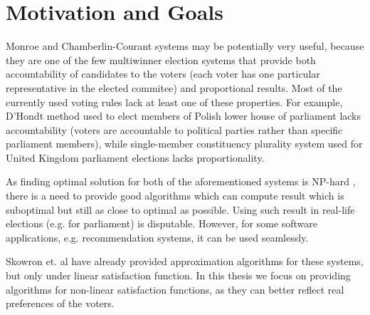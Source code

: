 \chapter{Motivation and Goals}
\label{cha:motivation}

Monroe and Chamberlin-Courant systems may be potentially very useful, because they are one of the few multiwinner election systems that provide both accountability of candidates to the voters (each voter has one particular representative in the elected commitee) and proportional results. Most of the currently used voting rules lack at least one of these properties. For example, D'Hondt method used to elect members of Polish lower house of parliament lacks accountability (voters are accountable to political parties rather than specific parliament members), while single-member constituency plurality system used for United Kingdom parliament elections lacks proportionality.

As finding optimal solution for both of the aforementioned systems is NP-hard \cite{2}, there is a need to provide good algorithms which can compute result which is suboptimal but still as close to optimal as possible. Using such result in real-life elections (e.g. for parliament) is disputable. However, for some software applications, e.g. recommendation systems, it can be used seamlessly.

Skowron et. al \cite{1} have already provided approximation algorithms for these systems, but only under linear satisfaction function. In this thesis we focus on providing algorithms for non-linear satisfaction functions, as they can better reflect real preferences of the voters.